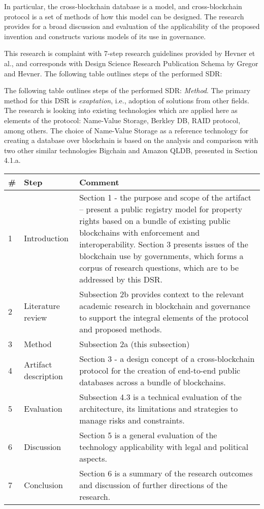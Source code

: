 \begin{multicols}{2}
In particular, the cross-blockchain database is a model, and cross-blockchain protocol is a set of methods of how this model can be designed. The research provides for a broad discussion and evaluation of the applicability of the proposed invention and constructs various models of its use in governance.

This research is complaint with 7-step research guidelines provided by Hevner et al., and corresponds with Design Science Research Publication Schema \cite{art1-key03} by Gregor and Hevner. The following table outlines steps of the performed SDR:

The following table outlines steps of the performed SDR: \textit{Method}. The primary method for this DSR is \textit{exaptation}, i.e., adoption of solutions from other fields. The research is looking into existing technologies which are applied here as elements of the protocol: Name-Value Storage, Berkley DB, RAID protocol, among others. The choice of Name-Value Storage as a reference technology for creating a database over blockchain is based on the analysis and comparison with two other similar technologies Bigchain and Amazon QLDB, presented in Section 4.1.a.
\end{multicols}
\begin{center}
\begin{tabular}{|l|l|m{13cm}|}
\hline
\textbf{\#} & \textbf{Step} & \textbf{Comment}\\\hline
1 & Introduction & Section 1 - the purpose and scope of the artifact – present a public registry model for property rights based on a bundle of existing public blockchains with enforcement and interoperability. Section 3 presents issues of the blockchain use by governments, which forms a corpus of research questions, which are to be addressed by this DSR.\\\hline
2 & Literature review & Subsection 2b provides context to the relevant academic research in blockchain and governance to support the integral elements of the protocol and proposed methods.\\\hline
3 & Method & Subsection 2a (this subsection)\\\hline
4 & Artifact description & Section 3 - a design concept of a cross-blockchain protocol for the creation of end-to-end public databases across a bundle of blockchains.\\\hline
5 & Evaluation & Subsection 4.3 is a technical evaluation of the architecture, its limitations and strategies to manage risks and constraints.\\\hline
6 & Discussion & Section 5 is a general evaluation of the technology applicability with legal and political aspects.\\\hline
7 & Conclusion & Section 6 is a summary of the research outcomes and discussion of further directions of the research.\\
\hline
\end{tabular}
\end{center}
